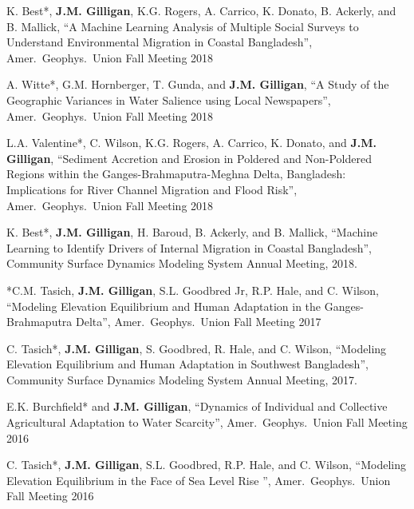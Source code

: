 %
%
    \item
    K. Best*, \textbf{J.M. Gilligan}, K.G. Rogers, A. Carrico, K. Donato, B. Ackerly, and B. Mallick,
    \enquote{A Machine Learning Analysis of Multiple Social Surveys to Understand Environmental Migration in Coastal Bangladesh},
    Amer.\ Geophys.\ Union Fall Meeting 2018

    \item
    A. Witte*, G.M. Hornberger, T. Gunda, and \textbf{J.M. Gilligan},
    \enquote{A Study of the Geographic Variances in Water Salience using Local Newspapers},
    Amer.\ Geophys.\ Union Fall Meeting 2018

    \item
    L.A. Valentine*,  C. Wilson, K.G. Rogers, A. Carrico, K. Donato, and \textbf{J.M. Gilligan},
    \enquote{Sediment Accretion and Erosion in Poldered and Non-Poldered Regions within the
        Ganges-Brahmaputra-Meghna Delta, Bangladesh: Implications for River Channel Migration and Flood Risk},
    Amer.\ Geophys.\ Union Fall Meeting 2018

    \item
    K. Best*, \textbf{J.M. Gilligan}, H. Baroud, B. Ackerly, and B. Mallick,
    \enquote{Machine Learning to Identify Drivers of Internal Migration in Coastal Bangladesh},
    Community Surface Dynamics Modeling System Annual Meeting, 2018.

    \item
    *C.M. Tasich, \textbf{J.M. Gilligan}, S.L. Goodbred Jr, R.P. Hale, and C. Wilson,
    \enquote{Modeling Elevation Equilibrium and Human Adaptation in the Ganges-Brahmaputra Delta},
    Amer.\ Geophys.\ Union Fall Meeting 2017

    \item
    C. Tasich*, \textbf{J.M. Gilligan}, S. Goodbred, R. Hale, and C. Wilson,
    \enquote{Modeling Elevation Equilibrium and Human Adaptation in Southwest Bangladesh},
    Community Surface Dynamics Modeling System Annual Meeting, 2017.

    \item
    E.K. Burchfield* and \textbf{J.M. Gilligan},
    \enquote{Dynamics of Individual and Collective Agricultural Adaptation to Water Scarcity},
    Amer.\ Geophys.\ Union Fall Meeting 2016

    \item
    C. Tasich*, \textbf{J.M. Gilligan}, S.L. Goodbred, R.P. Hale, and C. Wilson,
    \enquote{Modeling Elevation Equilibrium in the Face of Sea Level Rise },
    Amer.\ Geophys.\ Union Fall Meeting 2016

